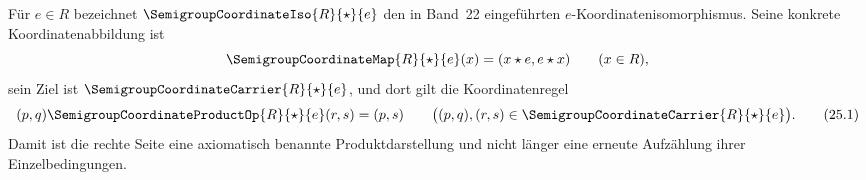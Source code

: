 \documentclass[main.tex]{subfiles}
\begin{document}
\ProofWideReasonsAtRight


Für \(e\in R\) bezeichnet
\(\SemigroupCoordinateIso{R}{\star}{e}\) den in Band~22 eingeführten
\(e\)-Koordinatenisomorphismus.  Seine konkrete Koordinatenabbildung ist
\[
  \SemigroupCoordinateMap{R}{\star}{e}(x)
  =(x\star e,e\star x)\qquad(x\in R),
\]
sein Ziel ist
\(\SemigroupCoordinateCarrier{R}{\star}{e}\), und dort gilt die
Koordinatenregel
\[
  (p,q)\SemigroupCoordinateProductOp{R}{\star}{e}(r,s)=(p,s)
  \qquad
  \bigl((p,q),(r,s)\in
    \SemigroupCoordinateCarrier{R}{\star}{e}\bigr).       \tag{25.1}
\]
Damit ist die rechte Seite eine axiomatisch benannte Produktdarstellung
und nicht länger eine erneute Aufzählung ihrer Einzelbedingungen.
\end{document}
